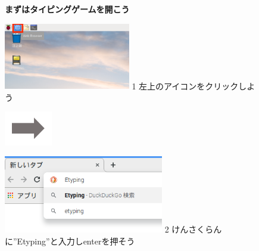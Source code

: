 \documentclass[a4paper,12pt]{jarticle}
\begin{document}
\begin{figure}[t]
  \centering


  {\centering
    \textbf{まずはタイピングゲームを開こう}
    \par}

  \centering

  \begin{minipage}{5.695cm}
    \includegraphics[width=5.523cm]{textbook-img071.png}
    1 左上のアイコンをクリックしよう
  \end{minipage}
  \includegraphics[width=2.094cm]{textbook-img084.png}
  \begin{minipage}{6.582cm}
    \includegraphics[width=6.985cm]{textbook-img083.png}
    2 けんさくらんに”Etyping”と入力しenterを押そう
  \end{minipage}



\end{figure}
\end{document}
